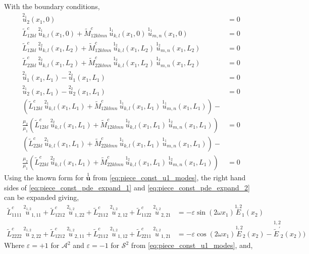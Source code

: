 \documentclass[11pt]{report}
\begin{document}
\begin{appendices}
\begin{align}
\begin{gathered}
\end{gathered}
\end{align}
With the boundary conditions,
\begin{equation} \label{eq:piece_const_bc_raw}
\begin{aligned}
\overset{2_1}{u}_2(x_1, 0) &= 0 \\
\tilde{L}^c_{12kl} \: \overset{2_1}{u}_{k,l}(x_1, 0) + \tilde{M}^c_{12klmn} \: \overset{1_1}{u}_{k,l}(x_1, 0) \: \overset{1_1}{u}_{m,n}(x_1, 0) &= 0 \\
\tilde{L}^c_{12kl} \: \overset{2_2}{u}_{k,l}(x_1, L_2) + \tilde{M}^c_{12klmn} \: \overset{1_2}{u}_{k,l}(x_1, L_2) \: \overset{1_2}{u}_{m,n}(x_1, L_2) &= 0 \\
\tilde{L}^c_{22kl} \: \overset{2_2}{u}_{k,l}(x_1, L_2) + \tilde{M}^c_{22klmn} \: \overset{1_2}{u}_{k,l}(x_1, L_2) \: \overset{1_2}{u}_{m,n}(x_1, L_2) &= 0 \\
\overset{2_1}{u}_1(x_1, L_1) - \overset{2_2}{u}_1(x_1, L_1) &= 0 \\
\overset{2_1}{u}_2(x_1, L_1) - \overset{2_2}{u}_2(x_1, L_1) &= 0 \\
\left ( \tilde{L}^c_{12kl} \: \overset{2_1}{u}_{k,l}(x_1, L_1) + \tilde{M}^c_{12klmn} \: \overset{1_1}{u}_{k,l}(x_1, L_1) \: \overset{1_1}{u}_{m,n}(x_1, L_1) \right ) - \\
\frac{\mu_2}{\mu_1} \left( \tilde{L}^c_{12kl} \: \overset{2_2}{u}_{k,l}(x_1, L_1) + \tilde{M}^c_{12klmn} \: \overset{1_2}{u}_{k,l}(x_1, L_1) \: \overset{1_2}{u}_{m,n}(x_1, L_1) \right )  &= 0 \\
\left ( \tilde{L}^c_{22kl} \: \overset{2_1}{u}_{k,l}(x_1, L_1) + \tilde{M}^c_{22klmn} \: \overset{1_1}{u}_{k,l}(x_1, L_1) \: \overset{1_1}{u}_{m,n}(x_1, L_1) \right ) - \\
\frac{\mu_2}{\mu_1} \left( \tilde{L}^c_{22kl} \: \overset{2_2}{u}_{k,l}(x_1, L_1) + \tilde{M}^c_{22klmn} \: \overset{1_2}{u}_{k,l}(x_1, L_1) \: \overset{1_2}{u}_{m,n}(x_1, L_1) \right )  &= 0
\end{aligned}
\end{equation}
Using the known form for $\overset{1}{\mathbf{u}}$ from \eqref{eq:piece_const_u1_modes}, the right hand sides of \eqref{eq:piece_const_pde_expand_1} and \eqref{eq:piece_const_pde_expand_2} can be expanded giving,
\begin{align}
\tilde{L}^{c}_{1111} \: \overset{2_{1,2}}{u}_{1,11} + \tilde{L}^{c}_{1212} \: \overset{2_{1,2}}{u}_{1,22}+ \tilde{L}^{c}_{2112} \: \overset{2_{1,2}}{u}_{2,12}  + \tilde{L}^{c}_{1122} \: \overset{2_{1,2}}{u}_{2,21} &= - \varepsilon \sin(2 \omega x_1) \overset{{1,2}}{E}_1(x_2) \label{eq:piece_const_pde_expand_12} \\
\tilde{L}^{c}_{2222} \: \overset{2_{1,2}}{u}_{2,22}+ \tilde{L}^{c}_{1212} \: \overset{2_{1,2}}{u}_{2,11}+ \tilde{L}^{c}_{2112} \: \overset{2_{1,2}}{u}_{1,12}  + \tilde{L}^{c}_{2211} \: \overset{2_{1,2}}{u}_{1,21} &= - \varepsilon \cos(2 \omega x_1) \overset{{1,2}}{E}_2(x_2) - \overset{{1,2}}{\widetilde{E}^{\prime}}_2(x_2)) \label{eq:piece_const_pde_expand_22}
\end{align}
Where $\varepsilon = +1$ for $\mathcal{A}^2$ and $\varepsilon = -1$ for $\mathcal{S}^2$ from \eqref{eq:piece_const_u1_modes}, and,


\end{appendices}
\end{document}
